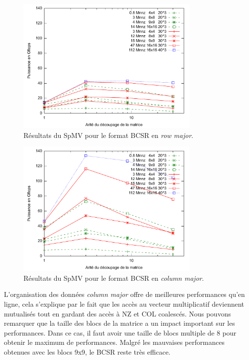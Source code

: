 \documentclass[a4paper,11pt]{report}
\begin{document}
   \begin{figure}[h!]\begin{center}
     \includegraphics[width=0.8\textwidth]{resultats/BCSR_row.pdf}
     \caption{Résultats du SpMV pour le format BCSR en \textit{row major}.}
     \label{res_bcsr_row}
   \end{center}\end{figure}
   \begin{figure}[h!]\begin{center}
     \includegraphics[width=0.8\textwidth]{resultats/BCSR_col.pdf}
     \caption{Résultats du SpMV pour le format BCSR en \textit{column major}.}
     \label{res_bcsr_col}
   \end{center}\end{figure}
   
   L'organisation des données \textit{column major} offre de meilleures performances
   qu'en ligne, cela s'explique par le fait que les accès au vecteur
   multiplicatif deviennent mutualisés tout en gardant des accès à NZ
   et COL coalescés. 
   Nous pouvons remarquer que la taille des blocs de la matrice a un
   impact important sur les performances. Dans ce cas, il faut avoir
   une taille de blocs multiple de 8 pour obtenir le maximum de
   performances. Malgré les mauvaises performances obtenues avec les
   blocs 9x9, le BCSR reste très efficace.
   
\end{document}
